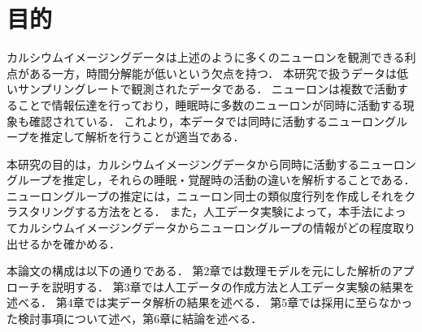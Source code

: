 \section{目的}
カルシウムイメージングデータは上述のように多くのニューロンを観測できる利点がある一方，時間分解能が低いという欠点を持つ．
本研究で扱うデータは低いサンプリングレートで観測されたデータである．
ニューロンは複数で活動することで情報伝達を行っており，睡眠時に多数のニューロンが同時に活動する現象も確認されている．
これより，本データでは同時に活動するニューロングループを推定して解析を行うことが適当である．

本研究の目的は，カルシウムイメージングデータから同時に活動するニューロングループを推定し，それらの睡眠・覚醒時の活動の違いを解析することである．
ニューロングループの推定には，ニューロン同士の類似度行列を作成しそれをクラスタリングする方法をとる．
また，人工データ実験によって，本手法によってカルシウムイメージングデータからニューロングループの情報がどの程度取り出せるかを確かめる．

本論文の構成は以下の通りである．
第2章では数理モデルを元にした解析のアプローチを説明する．
第3章では人工データの作成方法と人工データ実験の結果を述べる．
第4章では実データ解析の結果を述べる．
第5章では採用に至らなかった検討事項について述べ，第6章に結論を述べる．
